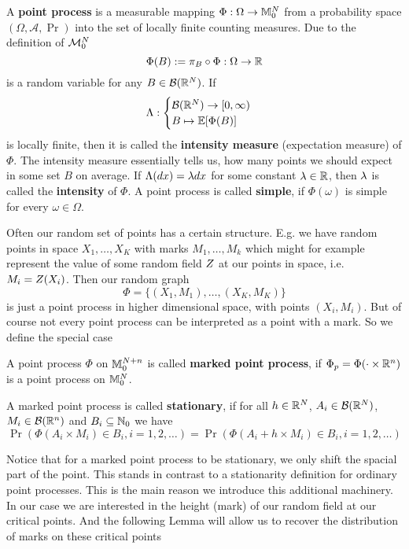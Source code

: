 \begin{definition}
	A \textbf{point process} is a measurable mapping \(\Phi:\Omega\to\locFiniteMeasure\)
	from a probability space \((\Omega, \mathcal{A}, \Pr)\) into the set of
	locally finite counting measures. Due to the definition of \(\locFiniteMeasAlg\)
	\[
		\Phi(B) := \pi_B\circ \Phi : \Omega \to \real
	\]
	is a random variable for any \(B\in\borel(\real^\dimension)\). If
	\[
		\intensityMeas:\begin{cases}
			\borel(\real^\dimension)\to [0,\infty)\\
			B \mapsto \E[\Phi(B)]
		\end{cases}
	\]
	is locally finite, then it is called the \textbf{intensity measure}
	(expectation measure) of \(\Phi\). The intensity measure essentially tells
	us, how many points we should expect in some set \(B\) on average.
	If \(\intensityMeas(dx) = \intensity dx\) for some
	constant \(\intensity\in\real\), then \(\intensity\) is called the
	\textbf{intensity} of \(\Phi\).
	A point process is called \textbf{simple}, if \(\Phi(\omega)\) is simple
	for every \(\omega\in\Omega\).
\end{definition}

Often our random set of points has a certain structure. E.g. we have
random points in space \(X_1,\dots, X_K\) with marks \(M_1,\dots, M_k\) which
might for example represent the value of some random field \(\rf\) at our
points in space, i.e. \(M_i=\rf(X_i)\). Then our random graph 
\[
	\Phi = \{ (X_1, M_1), \dots, (X_K, M_K) \}
\]
is just a point process in higher dimensional space, with points \((X_i, M_i)\).
But of course not every point process can be interpreted as a point with a mark.
So we define the special case

\begin{definition}
	A point process \(\Phi\) on \(\locFiniteMeasure[\dimension+n]\) is called
	\textbf{marked point process}, if \(\Phi_p = \Phi(\cdot \times \real^n)\)
	is a point process on \(\locFiniteMeasure\).

	A marked point process is called \textbf{stationary}, if for all
	\(h\in\real^\dimension\), \(A_i\in\borel(\real^\dimension)\),
	\(M_i\in\borel(\real^n)\) and \(B_i\subseteq\nat_0\) we have
	\[
		\Pr(\Phi(A_i\times M_i) \in B_i, i=1,2,\dots)
		= \Pr(\Phi(A_i+h \times M_i)\in B_i, i=1,2,\dots)
	\]
\end{definition}

Notice that for a marked point process to be stationary, we only shift the
spacial part of the point. This stands in contrast to a stationarity definition
for ordinary point processes. This is the main reason we introduce this
additional machinery. In our case we are interested in the height (mark) of
our random field at our critical points. And the following Lemma will allow us
to recover the distribution of marks on these critical points

